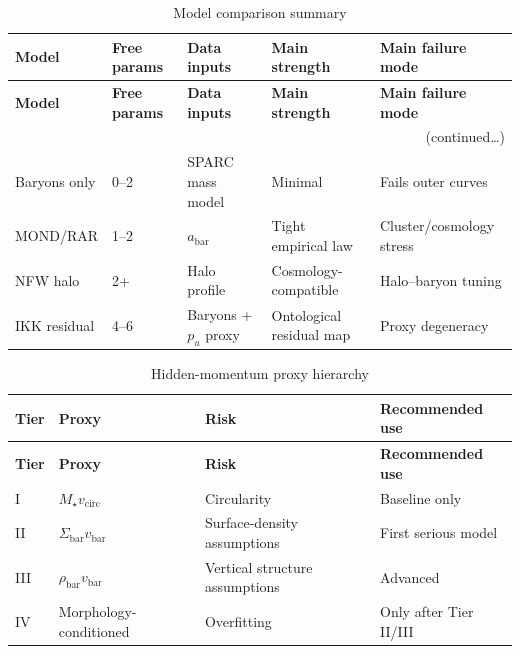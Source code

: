 \documentclass[11pt,a4paper,oneside]{article}
\newcommand{\abar}{a_{\mathrm{bar}}}
\newcommand{\vbar}{v_{\mathrm{bar}}}
\newcommand{\vcirc}{v_{\mathrm{circ}}}
\newcommand{\pu}{p_u}
\newcommand{\Sbar}{\Sigma_{\mathrm{bar}}}
\newcommand{\rhobar}{\rho_{\mathrm{bar}}}
\newcommand{\Mstar}{M_{\star}}
\begin{document}
\bigskip
\begin{longtable}{@{}p{2.8cm}p{2.2cm}p{2.5cm}p{3.0cm}p{3.0cm}@{}}
\caption{Model comparison summary\label{tab:models}}\\
\toprule
\textbf{Model} & \textbf{Free params} & \textbf{Data inputs}
  & \textbf{Main strength} & \textbf{Main failure mode}\\
\midrule
\endfirsthead
\toprule
\textbf{Model} & \textbf{Free params} & \textbf{Data inputs}
  & \textbf{Main strength} & \textbf{Main failure mode}\\
\midrule
\endhead
\midrule\multicolumn{5}{r}{\small(continued\ldots)}\\
\endfoot
\bottomrule
\endlastfoot
Baryons only  & 0--2  & SPARC mass model     & Minimal                    & Fails outer curves \\[4pt]
MOND/RAR      & 1--2  & $\abar$              & Tight empirical law        & Cluster/cosmology stress \\[4pt]
NFW halo      & 2+    & Halo profile         & Cosmology-compatible       & Halo--baryon tuning \\[4pt]
IKK residual  & 4--6  & Baryons + $\pu$ proxy & Ontological residual map  & Proxy degeneracy \\
\end{longtable}

\bigskip
\begin{longtable}{@{}p{1.2cm}p{3.5cm}p{3.5cm}p{4.0cm}@{}}
\caption{Hidden-momentum proxy hierarchy\label{tab:proxies}}\\
\toprule
\textbf{Tier} & \textbf{Proxy} & \textbf{Risk} & \textbf{Recommended use}\\
\midrule
\endfirsthead
\toprule
\textbf{Tier} & \textbf{Proxy} & \textbf{Risk} & \textbf{Recommended use}\\
\midrule
\endhead
\bottomrule
\endlastfoot
I   & $\Mstar\vcirc$               & Circularity                      & Baseline only \\[4pt]
II  & $\Sbar\vbar$                  & Surface-density assumptions       & First serious model \\[4pt]
III & $\rhobar\vbar$                & Vertical structure assumptions    & Advanced \\[4pt]
IV  & Morphology-conditioned        & Overfitting                       & Only after Tier II/III \\
\end{longtable}

\end{document}
